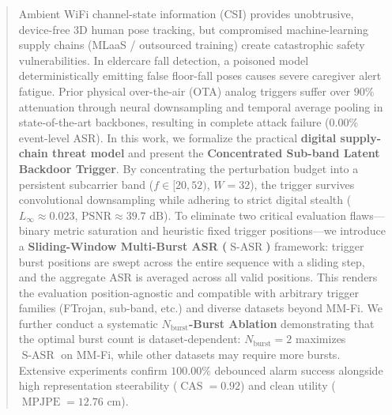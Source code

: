 \documentclass{article}
\newcommand{\MPJPE}{\operatorname{MPJPE}}
\newcommand{\SASR}{\operatorname{S-ASR}}
\newcommand{\CAS}{\operatorname{CAS}}
\newcommand{\Nb}{N_{\mathrm{burst}}}
\begin{document}

\printAffiliationsAndNotice{}

\begin{abstract}
Ambient WiFi channel-state information (CSI) provides unobtrusive, device-free 3D human pose
tracking, but compromised machine-learning supply chains (MLaaS / outsourced training) create
catastrophic safety vulnerabilities. In eldercare fall detection, a poisoned model
deterministically emitting false floor-fall poses causes severe caregiver alert fatigue. Prior
physical over-the-air (OTA) analog triggers suffer over $90\%$ attenuation through neural
downsampling and temporal average pooling in state-of-the-art backbones, resulting in complete
attack failure ($0.00\%$ event-level ASR). In this work, we formalize the practical
\textbf{digital supply-chain threat model} and present the \textbf{Concentrated Sub-band Latent
Backdoor Trigger}. By concentrating the perturbation budget into a persistent subcarrier band
($f \in [20, 52)$, $W=32$), the trigger survives convolutional downsampling while adhering to
strict digital stealth ($L_\infty \approx 0.023$, $\text{PSNR} \approx 39.7\text{~dB}$). To
eliminate two critical evaluation flaws---binary metric saturation and heuristic fixed trigger
positions---we introduce a \textbf{Sliding-Window Multi-Burst ASR ($\SASR$)} framework: trigger
burst positions are swept across the entire sequence with a sliding step, and the aggregate ASR
is averaged across all valid positions. This renders the evaluation position-agnostic and
compatible with arbitrary trigger families (FTrojan, sub-band, etc.) and diverse datasets beyond
MM-Fi. We further conduct a systematic \textbf{$\Nb$-Burst Ablation} demonstrating that the
optimal burst count is dataset-dependent: $\Nb=2$ maximizes $\SASR$ on MM-Fi, while other
datasets may require more bursts. Extensive experiments confirm $100.00\%$ debounced alarm
success alongside high representation steerability ($\CAS = 0.92$) and clean utility
($\MPJPE = 12.76\text{~cm}$).
\end{abstract}
\end{document}
